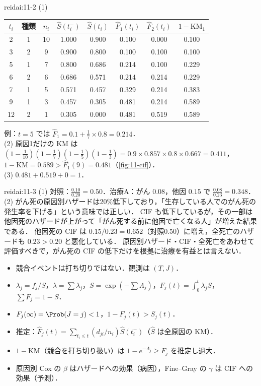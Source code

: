 \begin{kaitou}{reidai:11-2}
(1)
\begin{center}\small
\begin{tabular}{@{}cccccccc@{}}
\toprule
$t_i$ & 種類 & $n_i$ & $\hat S(t_i^-)$ & $\hat S(t_i)$ & $\hat F_1(t_i)$ & $\hat F_2(t_i)$ & $1-\mathrm{KM}_1$\\
\midrule
2 & 1 & 10 & 1.000 & 0.900 & 0.100 & 0.000 & 0.100\\
3 & 2 & 9 & 0.900 & 0.800 & 0.100 & 0.100 & 0.100\\
5 & 1 & 7 & 0.800 & 0.686 & 0.214 & 0.100 & 0.229\\
6 & 2 & 6 & 0.686 & 0.571 & 0.214 & 0.214 & 0.229\\
7 & 1 & 5 & 0.571 & 0.457 & 0.329 & 0.214 & 0.383\\
9 & 1 & 3 & 0.457 & 0.305 & 0.481 & 0.214 & 0.589\\
12 & 2 & 1 & 0.305 & 0.000 & 0.481 & 0.519 & 0.589\\
\bottomrule
\end{tabular}
\end{center}
例：$t=5$ では $\hat F_1=0.1+\frac17\times0.8=0.214$．\\
(2) 原因1だけの KM は $(1-\frac1{10})(1-\frac17)(1-\frac15)(1-\frac13)=0.9\times0.857\times0.8\times0.667=0.411$，
$1-\mathrm{KM}=0.589>\hat F_1(9)=0.481$（\cref{fig:11-cif}）．\\
(3) $0.481+0.519+0=1$．
\end{kaitou}

\begin{kaitou}{reidai:11-3}
(1) 対照：$\frac{0.10}{0.20}=0.50$．治療A：がん $0.08$，他因 $0.15$ で $\frac{0.08}{0.23}=0.348$．\\
(2) がん死の原因別ハザードは20\%低下しており，「生存している人でのがん死の発生率を下げる」という意味では正しい．
CIF も低下しているが，その一部は他因死のハザードが上がって「がん死する前に他因で亡くなる人」が増えた結果である．
他因死の CIF は $0.15/0.23=0.652$（対照0.50）に増え，全死亡のハザードも $0.23>0.20$ と悪化している．
原因別ハザード・CIF・全死亡をあわせて評価すべきで，がん死の CIF の低下だけを根拠に治療を有益とは言えない．
\end{kaitou}

\enlargethispage{3\baselineskip}
\begin{summarybox}
\begin{itemize}
\item 競合イベントは打ち切りではない．観測は $(T,J)$．
\item $\lambda_j=f_j/S$，$\lambda=\sum\lambda_j$，$S=\exp(-\sum\Lambda_j)$，$F_j(t)=\int_0^t\lambda_jS$，$\sum F_j=1-S$．
\item $F_j(\infty)=\Prob(J=j)<1$，$1-F_j(t)>S_j(t)$．
\item 推定：$\hat F_j(t)=\sum_{t_i\le t}(d_{ji}/n_i)\hat S(t_i^-)$（$\hat S$ は全原因の KM）．
\item $1-\mathrm{KM}$（競合を打ち切り扱い）は $1-e^{-\Lambda_j}\ge F_j$ を推定し過大．
\item 原因別 Cox の $\beta$ はハザードへの効果（病因），Fine--Gray の $\gamma$ は CIF への効果（予測）．
\end{itemize}
\end{summarybox}
